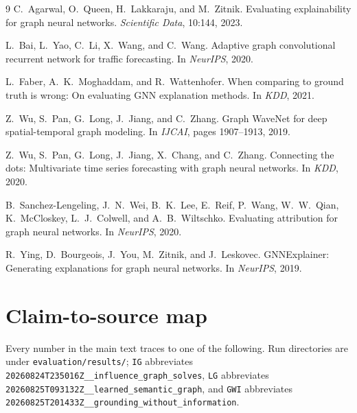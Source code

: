 \documentclass{article}
\begin{document}
\begin{thebibliography}{9}
C.~Agarwal, O.~Queen, H.~Lakkaraju, and M.~Zitnik.
\newblock Evaluating explainability for graph neural networks.
\newblock \emph{Scientific Data}, 10:144, 2023.

L.~Bai, L.~Yao, C.~Li, X.~Wang, and C.~Wang.
\newblock Adaptive graph convolutional recurrent network for traffic forecasting.
\newblock In \emph{NeurIPS}, 2020.

L.~Faber, A.~K.~Moghaddam, and R.~Wattenhofer.
\newblock When comparing to ground truth is wrong: On evaluating GNN explanation
methods.
\newblock In \emph{KDD}, 2021.

Z.~Wu, S.~Pan, G.~Long, J.~Jiang, and C.~Zhang.
\newblock Graph WaveNet for deep spatial-temporal graph modeling.
\newblock In \emph{IJCAI}, pages 1907--1913, 2019.

Z.~Wu, S.~Pan, G.~Long, J.~Jiang, X.~Chang, and C.~Zhang.
\newblock Connecting the dots: Multivariate time series forecasting with graph
neural networks.
\newblock In \emph{KDD}, 2020.

B.~Sanchez-Lengeling, J.~N.~Wei, B.~K.~Lee, E.~Reif, P.~Wang, W.~W.~Qian,
K.~McCloskey, L.~J.~Colwell, and A.~B.~Wiltschko.
\newblock Evaluating attribution for graph neural networks.
\newblock In \emph{NeurIPS}, 2020.

R.~Ying, D.~Bourgeois, J.~You, M.~Zitnik, and J.~Leskovec.
\newblock GNNExplainer: Generating explanations for graph neural networks.
\newblock In \emph{NeurIPS}, 2019.
\end{thebibliography}

\appendix

\section{Claim-to-source map}
\label{app:sources}

Every number in the main text traces to one of the following. Run directories are
under \texttt{evaluation/results/}; \texttt{IG} abbreviates
\texttt{20260824T235016Z\_\_influence\_graph\_solves}, \texttt{LG} abbreviates
\texttt{20260825T093132Z\_\_learned\_semantic\_graph}, and \texttt{GWI} abbreviates
\texttt{20260825T201433Z\_\_grounding\_without\_information}.
\end{document}
